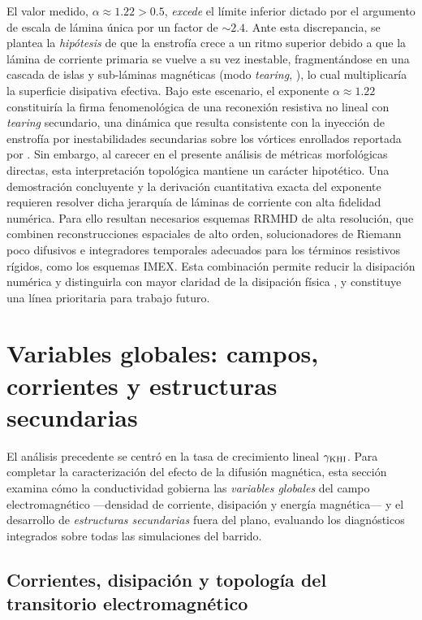 \primerparrafo El valor medido, $\alpha\approx1.22>0.5$, \emph{excede} el límite inferior dictado por el argumento de escala de lámina única por un factor de $\sim2.4$. Ante esta discrepancia, se plantea la \emph{hipótesis} de que la enstrofía crece a un ritmo superior debido a que la lámina de corriente primaria se vuelve a su vez inestable, fragmentándose en una cascada de islas y sub-láminas magnéticas (modo \emph{tearing}, \cite{furth1963}), lo cual multiplicaría la superficie disipativa efectiva. Bajo este escenario, el exponente $\alpha\approx1.22$ constituiría la firma fenomenológica de una reconexión resistiva no lineal con \emph{tearing} secundario, una dinámica que resulta consistente con la inyección de enstrofía por inestabilidades secundarias sobre los vórtices enrollados reportada por \textcite{nastro2022}. Sin embargo, al carecer en el presente análisis de métricas morfológicas directas, esta interpretación topológica mantiene un carácter hipotético. Una demostración concluyente y la derivación cuantitativa exacta del exponente
requieren resolver dicha jerarquía de láminas de corriente con alta fidelidad
numérica. Para ello resultan necesarios esquemas RRMHD de alta resolución, que
combinen reconstrucciones espaciales de alto orden, solucionadores de Riemann
poco difusivos e integradores temporales adecuados para los términos resistivos
rígidos, como los esquemas IMEX. Esta combinación permite reducir la disipación
numérica y distinguirla con mayor claridad de la disipación física \parencite{mignone2024}, y constituye una línea prioritaria para trabajo futuro.

\section[Variables globales y estructuras secundarias]{Variables globales: campos, corrientes y estructuras secundarias}
\label{sec:globales}

\primerparrafo El análisis precedente se centró en la tasa de crecimiento lineal $\gamma_{\mathrm{KHI}}$. Para completar la caracterización del efecto de la difusión magnética, esta sección examina cómo la conductividad gobierna las \emph{variables globales} del campo electromagnético ---densidad de corriente, disipación y energía magnética--- y el desarrollo de \emph{estructuras secundarias} fuera del plano, evaluando los diagnósticos integrados sobre todas las simulaciones del barrido.

\subsection{Corrientes, disipación y topología del transitorio electromagnético}

